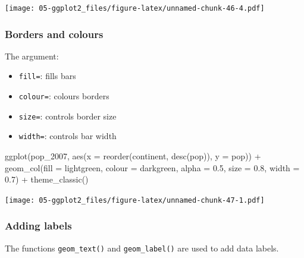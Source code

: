\documentclass[
]{book}
\newenvironment{Shaded}{\begin{snugshade}}{\end{snugshade}}
\newcommand{\AttributeTok}[1]{\textcolor[rgb]{0.77,0.63,0.00}{#1}}
\newcommand{\FloatTok}[1]{\textcolor[rgb]{0.00,0.00,0.81}{#1}}
\newcommand{\FunctionTok}[1]{\textcolor[rgb]{0.00,0.00,0.00}{#1}}
\newcommand{\NormalTok}[1]{#1}
\newcommand{\SpecialCharTok}[1]{\textcolor[rgb]{0.00,0.00,0.00}{#1}}
\newcommand{\StringTok}[1]{\textcolor[rgb]{0.31,0.60,0.02}{#1}}
\providecommand{\tightlist}{%
  \setlength{\itemsep}{0pt}\setlength{\parskip}{0pt}}
\begin{document}
\texttt{[image: 05-ggplot2\_files/figure-latex/unnamed-chunk-46-4.pdf]}

\hypertarget{borders-and-colours}{%
\subsubsection{Borders and colours}\label{borders-and-colours}}

The argument:

\begin{itemize}
\tightlist
\item
  \texttt{fill=}: fills bars
\item
  \texttt{colour=}: colours borders
\item
  \texttt{size=}: controls border size
\item
  \texttt{width=}: controls bar width
\end{itemize}

\begin{Shaded}
\begin{Highlighting}[]
\FunctionTok{ggplot}\NormalTok{(pop\_2007, }\FunctionTok{aes}\NormalTok{(}\AttributeTok{x =} \FunctionTok{reorder}\NormalTok{(continent, }\FunctionTok{desc}\NormalTok{(pop)), }\AttributeTok{y =}\NormalTok{ pop)) }\SpecialCharTok{+} 
   \FunctionTok{geom\_col}\NormalTok{(}\AttributeTok{fill =} \StringTok{\textquotesingle{}lightgreen\textquotesingle{}}\NormalTok{, }\AttributeTok{colour =} \StringTok{\textquotesingle{}darkgreen\textquotesingle{}}\NormalTok{, }\AttributeTok{alpha =} \FloatTok{0.5}\NormalTok{, }\AttributeTok{size =} \FloatTok{0.8}\NormalTok{, }\AttributeTok{width =} \FloatTok{0.7}\NormalTok{) }\SpecialCharTok{+}
   \FunctionTok{theme\_classic}\NormalTok{()}
\end{Highlighting}
\end{Shaded}

\texttt{[image: 05-ggplot2\_files/figure-latex/unnamed-chunk-47-1.pdf]}

\hypertarget{adding-labels}{%
\subsubsection{Adding labels}\label{adding-labels}}

The functions \texttt{geom\_text()} and \texttt{geom\_label()} are used to add data labels.
\end{document}
